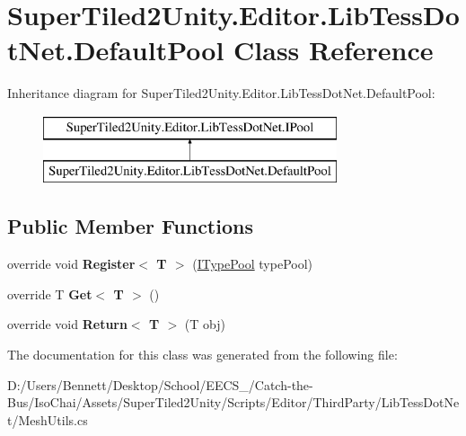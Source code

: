 \hypertarget{class_super_tiled2_unity_1_1_editor_1_1_lib_tess_dot_net_1_1_default_pool}{}\section{Super\+Tiled2\+Unity.\+Editor.\+Lib\+Tess\+Dot\+Net.\+Default\+Pool Class Reference}
\label{class_super_tiled2_unity_1_1_editor_1_1_lib_tess_dot_net_1_1_default_pool}
Inheritance diagram for Super\+Tiled2\+Unity.\+Editor.\+Lib\+Tess\+Dot\+Net.\+Default\+Pool\+:\begin{figure}[H]
\begin{center}
\leavevmode
\includegraphics[height=2.000000cm]{class_super_tiled2_unity_1_1_editor_1_1_lib_tess_dot_net_1_1_default_pool}
\end{center}
\end{figure}
\subsection*{Public Member Functions}
\begin{DoxyCompactItemize}
\item 
\mbox{\label{class_super_tiled2_unity_1_1_editor_1_1_lib_tess_dot_net_1_1_default_pool_a5371b482f2c6fa5293395a05b5055e2b}} 
override void {\bfseries Register$<$ T $>$} (\mbox{\hyperlink{interface_super_tiled2_unity_1_1_editor_1_1_lib_tess_dot_net_1_1_i_type_pool}{I\+Type\+Pool}} type\+Pool)
\item 
\mbox{\label{class_super_tiled2_unity_1_1_editor_1_1_lib_tess_dot_net_1_1_default_pool_a3275ab301e57c4b8c241f840c27d63ea}} 
override T {\bfseries Get$<$ T $>$} ()
\item 
\mbox{\label{class_super_tiled2_unity_1_1_editor_1_1_lib_tess_dot_net_1_1_default_pool_ac896c71ab21d0570a69c2d6f8c5efaf8}} 
override void {\bfseries Return$<$ T $>$} (T obj)
\end{DoxyCompactItemize}


The documentation for this class was generated from the following file\+:\begin{DoxyCompactItemize}
\item 
D\+:/\+Users/\+Bennett/\+Desktop/\+School/\+E\+E\+C\+S\+\_/\+Catch-\/the-\/\+Bus/\+Iso\+Chai/\+Assets/\+Super\+Tiled2\+Unity/\+Scripts/\+Editor/\+Third\+Party/\+Lib\+Tess\+Dot\+Net/Mesh\+Utils.\+cs\end{DoxyCompactItemize}

